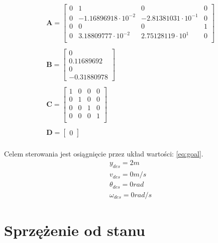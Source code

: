 \documentclass{article}
\begin{document}
\begin{equation}\label{eq:ss_val}
 \begin{array}{l}
  \mathbf{A} = \begin{bmatrix}  0 & 1 & 0 & 0 \\
  							   0 & -1.16896918\cdot10^{-2} & -2.81381031\cdot10^{-1} & 0 \\
  							  0 & 0 & 0 & 1 \\
  							   0 & 3.18809777\cdot10^{-2} & 2.75128119\cdot10^{1} & 0 \\ 
  			   \end{bmatrix} \\ \\
  			   
  \mathbf{B} = \begin{bmatrix} 0 \\ 0.11689692 \\ 0 \\ -0.31880978 \end{bmatrix} \\ \\
  
  \mathbf{C} = \begin{bmatrix} 1 & 0 & 0 & 0 \\
  							   0 & 1 & 0 & 0 \\
  							   0 & 0 & 1 & 0 \\
  							   0 & 0 & 0 & 1 \\ 
  			   \end{bmatrix} \\ \\
  
  \mathbf{D} = \begin{bmatrix} 0 \end{bmatrix} \\
\end{array}
\end{equation}

Celem sterowania jest osiągnięcie przez układ wartości: \ref{eq:goal}.
\begin{equation}\label{eq:goal}
 \begin{array}{l}
y_{des} = 2m \\
v_{des} = 0 m/s \\
\theta_{des} = 0 rad \\
\omega_{des} = 0 rad/s
\end{array}
\end{equation}

\section{Sprzężenie od stanu}
\end{document}
